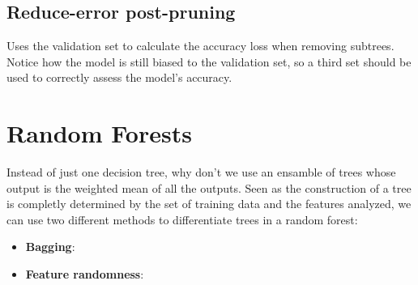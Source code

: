\subsection{Reduce-error post-pruning}
Uses the validation set to calculate the accuracy loss when removing subtrees. Notice how the model is still biased to the validation set, so a third set should be used to correctly assess the model's accuracy.

\section{Random Forests}
Instead of just one decision tree, why don't we use an ensamble of trees whose output is the weighted mean of all the outputs. Seen as the construction of a tree is completly determined by the set of training data and the features analyzed, we can use two different methods to differentiate trees in a random forest:
\begin{itemize}
\item \textbf{Bagging}:
\item \textbf{Feature randomness}:
\end{itemize}




% 
